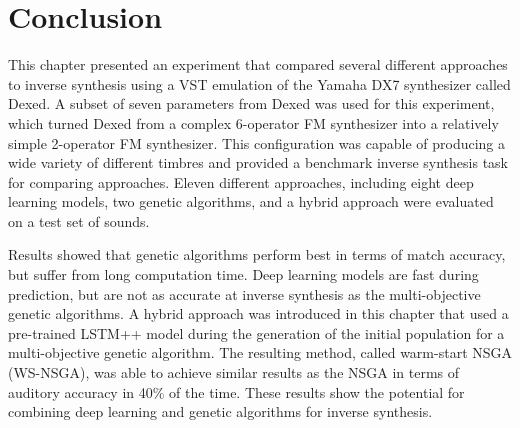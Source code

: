 

\section{Conclusion}
This chapter presented an experiment that compared several different approaches to inverse synthesis using a VST emulation of the Yamaha DX7 synthesizer called Dexed. A subset of seven parameters from Dexed was used for this experiment, which turned Dexed from a complex 6-operator FM synthesizer into a relatively simple 2-operator FM synthesizer. This configuration was capable of producing a wide variety of different timbres and provided a benchmark inverse synthesis task for comparing approaches. Eleven different approaches, including eight deep learning models, two genetic algorithms, and a hybrid approach were evaluated on a test set of sounds. %

Results showed that genetic algorithms perform best in terms of match accuracy, but suffer from long computation time. Deep learning models are fast during prediction, but are not as accurate at inverse synthesis as the multi-objective genetic algorithms. A hybrid approach was introduced in this chapter that used a pre-trained LSTM++ model during the generation of the initial population for a multi-objective genetic algorithm. The resulting method, called warm-start NSGA (WS-NSGA), was able to achieve similar results as the NSGA in terms of auditory accuracy in 40\% of the time. These results show the potential for combining deep learning and genetic algorithms for inverse synthesis.

